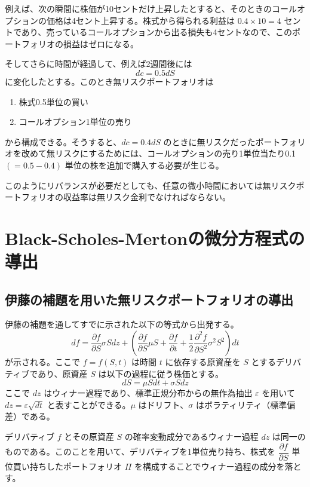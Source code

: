 \documentclass[uplatex]{jsarticle}
\begin{document}
例えば、次の瞬間に株価が10セントだけ上昇したとすると、そのときのコールオプションの価格は4セント上昇する。株式から得られる利益は $0.4 \times 10 = 4$ セントであり、売っているコールオプションから出る損失も4セントなので、このポートフォリオの損益はゼロになる。

そしてさらに時間が経過して、例えば2週間後には
$$
	dc = 0.5 dS
$$
に変化したとする。このとき無リスクポートフォリオは
\begin{enumerate}
	\item 株式0.5単位の買い
	\item コールオプション1単位の売り
\end{enumerate}
から構成できる。そうすると、$dc = 0.4 dS$ のときに無リスクだったポートフォリオを改めて無リスクにするためには、コールオプションの売り1単位当たり0.1 $(=0.5-0.4)$ 単位の株を追加で購入する必要が生じる。

このようにリバランスが必要だとしても、任意の微小時間においては無リスクポートフォリオの収益率は無リスク金利でなければならない。

\section{Black-Scholes-Mertonの微分方程式の導出}

\subsection{伊藤の補題を用いた無リスクポートフォリオの導出}

伊藤の補題を通してすでに示された以下の等式から出発する。
$$
	df = \dfrac{\partial f}{\partial S} \sigma S dz + \left( \dfrac{\partial f}{\partial S} \mu S + \dfrac{\partial f}{\partial t} + \dfrac{1}{2} \dfrac{\partial^{2} f}{\partial S^{2}} \sigma^{2} S^{2} \right) dt
$$
が示される。ここで $f=f(S,t)$ は時間 $t$ に依存する原資産を $S$ とするデリバティブであり、原資産 $S$ は以下の過程に従う株価とする。
$$
	dS = \mu S dt + \sigma S dz
$$
ここで $dz$ はウィナー過程であり、標準正規分布からの無作為抽出 $\varepsilon$ を用いて $dz = \varepsilon \sqrt{dt}$ と表すことができる。$\mu$ はドリフト、$\sigma$ はボラティリティ（標準偏差）である。

\bigskip

デリバティブ $f$ とその原資産 $S$ の確率変動成分であるウィナー過程 $dz$ は同一のものである。このことを用いて、デリバティブを1単位売り持ち、株式を $\dfrac{\partial f}{\partial S}$ 単位買い持ちしたポートフォリオ $\Pi$ を構成することでウィナー過程の成分を落とす。
\end{document}
